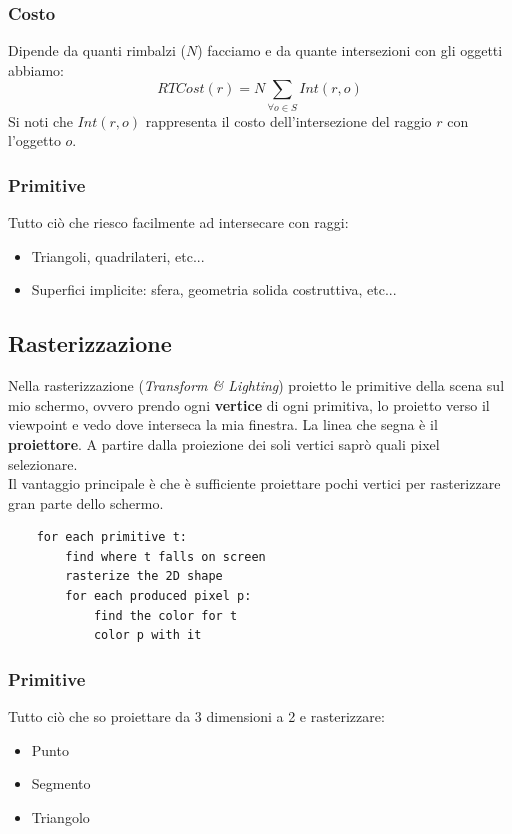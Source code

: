 \subsubsection{Costo}
Dipende da quanti rimbalzi ($N$) facciamo e da quante intersezioni con gli oggetti abbiamo:
\begin{equation}
	RTCost(r)=N \sum_{\forall o \in S} Int(r,o)
\end{equation}
Si noti che $Int(r,o)$ rappresenta il costo dell'intersezione del raggio $r$ con l'oggetto $o$.
\subsubsection{Primitive}
Tutto ciò che riesco facilmente ad intersecare con raggi:
\begin{itemize}
	\item Triangoli, quadrilateri, etc...
	\item Superfici implicite: sfera, geometria solida costruttiva, etc...
\end{itemize}

\subsection{Rasterizzazione}
Nella rasterizzazione (\textit{Transform \& Lighting}) proietto le primitive della scena sul mio schermo, ovvero prendo ogni \textbf{vertice} di ogni primitiva, lo proietto verso il viewpoint e vedo dove interseca la mia finestra. La linea che segna è il \textbf{proiettore}. A partire dalla proiezione dei soli vertici saprò quali pixel selezionare.\\
Il vantaggio principale è che è sufficiente proiettare pochi vertici per rasterizzare gran parte dello schermo.
\begin{lstlisting}
	for each primitive t:
		find where t falls on screen
		rasterize the 2D shape
		for each produced pixel p:
			find the color for t
			color p with it
\end{lstlisting}
\subsubsection{Primitive}
Tutto ciò che so proiettare da 3 dimensioni a 2 e rasterizzare:
\begin{itemize}
	\item Punto
	\item Segmento
	\item Triangolo
\end{itemize}
